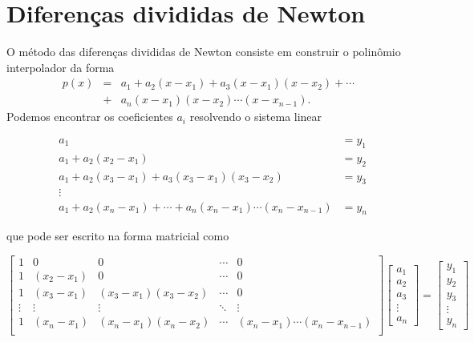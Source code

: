 \section{Diferenças divididas de Newton}
O método das diferenças divididas de Newton consiste em construir o polinômio interpolador da forma
\begin{eqnarray*}
p(x) &=& a_1 + a_2 (x-x_1) + a_3 (x-x_1)(x-x_2) + \cdots \\
     &+& a_n (x-x_1)(x-x_2)\cdots (x-x_{n-1}).
\end{eqnarray*}
Podemos encontrar os coeficientes $a_i$ resolvendo o sistema linear
\begin{small}
\begin{eqnarray*}
&a_1               &= y_1\\
&a_1+a_2(x_2-x_1)  &= y_2\\
&a_1+a_2(x_3-x_1)+a_3(x_3-x_1)(x_3-x_2) &= y_3\\
&\vdots&\\
&a_1+a_2(x_n-x_1)+\cdots + a_n(x_n-x_1)\cdots (x_n-x_{n-1}) &= y_n
\end{eqnarray*}
\end{small}
que pode ser escrito na forma matricial como
\begin{small}
  \begin{equation*}
    \begin{bmatrix}
      1& 0        & 0   & \!\cdots\!&0\\
      1&(x_2-x_1) & 0 &\!\cdots\!&0\\
      1&(x_3-x_1) &(x_3-x_1)(x_3-x_2) &\!\cdots\!&0\\
      \vdots&\vdots&\vdots&\!\ddots\!&\vdots\\
      1&(x_n-x_1) &(x_n-x_1)(x_n-x_2) &\!\cdots\!& (x_n-x_1)\cdots(x_n-x_{n-1})\\
    \end{bmatrix}\begin{bmatrix}
      a_1\\a_2\\a_3\\ \vdots \\a_n
    \end{bmatrix} = 
    \begin{bmatrix}
      y_1\\y_2\\y_3\\ \vdots \\y_n
    \end{bmatrix}
  \end{equation*}
\end{small}

